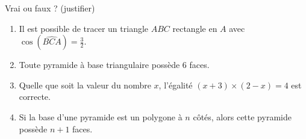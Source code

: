 
\begin{exercice}\label{exo2smath-0245}

    Vrai ou faux ? (justifier)
    \begin{enumerate}
        \item
            Il est possible de tracer un triangle \( ABC\) rectangle en \( A\) avec \( \cos(\widehat{BCA})=\frac{ 3 }{ 2 }\).
        \item
            Toute pyramide à base triangulaire possède \( 6\) faces.
        \item
            Quelle que soit la valeur du nombre \( x\), l'égalité  $(x+3)\times (2-x)=4$ est correcte.
        \item
            Si la base d'une pyramide est un polygone à \( n\) côtés, alors cette pyramide possède \( n+1\) faces.
    \end{enumerate}

\end{exercice}
